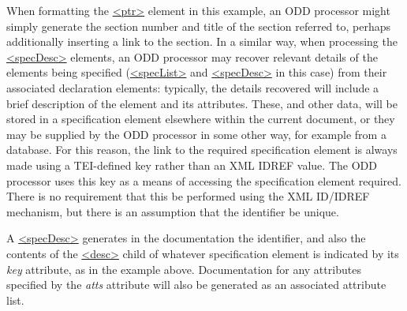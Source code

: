 When formatting the \hyperref[TEI.ptr]{<ptr>} element in this example, an ODD processor might simply generate the section number and title of the section referred to, perhaps additionally inserting a link to the section. In a similar way, when processing the \hyperref[TEI.specDesc]{<specDesc>} elements, an ODD processor may recover relevant details of the elements being specified (\hyperref[TEI.specList]{<specList>} and \hyperref[TEI.specDesc]{<specDesc>} in this case) from their associated declaration elements: typically, the details recovered will include a brief description of the element and its attributes. These, and other data, will be stored in a specification element elsewhere within the current document, or they may be supplied by the ODD processor in some other way, for example from a database. For this reason, the link to the required specification element is always made using a TEI-defined key rather than an XML IDREF value. The ODD processor uses this key as a means of accessing the specification element required. There is no requirement that this be performed using the XML ID/IDREF mechanism, but there is an assumption that the identifier be unique.\par
A \hyperref[TEI.specDesc]{<specDesc>} generates in the documentation the identifier, and also the contents of the \hyperref[TEI.desc]{<desc>} child of whatever specification element is indicated by its {\itshape key} attribute, as in the example above. Documentation for any attributes specified by the {\itshape atts} attribute will also be generated as an associated attribute list.

